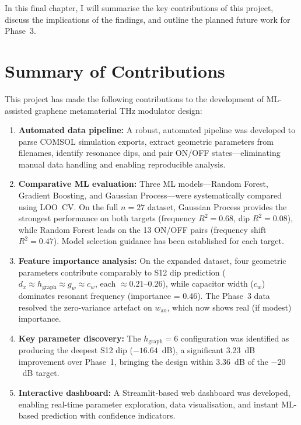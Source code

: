 \documentclass[12pt,a4paper]{report}
\begin{document}
In this final chapter, I will summarise the key contributions of this project, discuss the implications of the findings, and outline the planned future work for Phase~3.

\section{Summary of Contributions}
\label{sec:contributions}

This project has made the following contributions to the development of ML-assisted graphene metamaterial THz modulator design:

\begin{enumerate}[leftmargin=2cm]
    \item \textbf{Automated data pipeline:} A robust, automated pipeline was developed to parse COMSOL simulation exports, extract geometric parameters from filenames, identify resonance dips, and pair ON/OFF states---eliminating manual data handling and enabling reproducible analysis.

    \item \textbf{Comparative ML evaluation:} Three ML models---Random Forest, Gradient Boosting, and Gaussian Process---were systematically compared using LOO~CV. On the full $n=27$ dataset, Gaussian Process provides the strongest performance on both targets (frequency $R^2 = 0.68$, dip $R^2 = 0.08$), while Random Forest leads on the 13 ON/OFF pairs (frequency shift $R^2 = 0.47$). Model selection guidance has been established for each target.

    \item \textbf{Feature importance analysis:} On the expanded dataset, four geometric parameters contribute comparably to S12 dip prediction ($d_x \approx h_{\text{graph}} \approx g_w \approx c_w$, each $\approx 0.21$--$0.26$), while capacitor width ($c_w$) dominates resonant frequency (importance = 0.46). The Phase~3 data resolved the zero-variance artefact on $w_{\text{au}}$, which now shows real (if modest) importance.

    \item \textbf{Key parameter discovery:} The $h_{\text{graph}} = 6$ configuration was identified as producing the deepest S12 dip ($-16.64$~dB), a significant 3.23~dB improvement over Phase~1, bringing the design within 3.36~dB of the $-20$~dB target.

    \item \textbf{Interactive dashboard:} A Streamlit-based web dashboard was developed, enabling real-time parameter exploration, data visualisation, and instant ML-based prediction with confidence indicators.
\end{enumerate}
\end{document}
